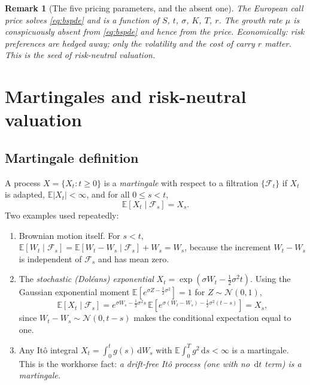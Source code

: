 \documentclass[11pt]{article}
\newcommand{\E}{\mathbb{E}}
\newcommand{\dd}{\,\mathrm{d}}
\newtheorem{remark}{Remark}
\begin{document}
\begin{remark}[The five pricing parameters, and the absent one]
The European call price solves \eqref{eq:bspde} and is a function of $S$, $t$, $\sigma$, $K$, $T$,
$r$. The growth rate $\mu$ is conspicuously \emph{absent} from \eqref{eq:bspde} and hence from the
price. Economically: risk preferences are hedged away; only the volatility and the cost of carry $r$
matter. This is the seed of risk-neutral valuation.
\end{remark}

\section{Martingales and risk-neutral valuation}

\subsection{Martingale definition}
A process $X=\{X_t : t\ge0\}$ is a \emph{martingale} with respect to a filtration $\{\mathcal F_t\}$ if
$X_t$ is adapted, $\E|X_t|<\infty$, and for all $0\le s<t$,
\begin{equation}
\E[X_t \mid \mathcal F_s] = X_s.
\end{equation}
Two examples used repeatedly:
\begin{enumerate}[label=(\alph*)]
\item Brownian motion itself. For $s<t$,
$\E[W_t\mid\mathcal F_s] = \E[W_t - W_s \mid \mathcal F_s] + W_s = W_s$,
because the increment $W_t-W_s$ is independent of $\mathcal F_s$ and has mean zero.
\item The \emph{stochastic (Dol\'eans) exponential} $X_t = \exp(\sigma W_t - \tfrac12\sigma^2 t)$.
Using the Gaussian exponential moment $\E[e^{\sigma Z - \frac12\sigma^2}]=1$ for $Z\sim\mathcal N(0,1)$,
\begin{equation}
\E[X_t\mid\mathcal F_s]
= e^{\sigma W_s - \frac12\sigma^2 s}\,
\E\!\left[e^{\sigma(W_t-W_s) - \frac12\sigma^2(t-s)}\right]
= X_s,
\end{equation}
since $W_t-W_s\sim\mathcal N(0,t-s)$ makes the conditional expectation equal to one.
\item Any It\^o integral $X_t = \int_0^t g(s)\dd W_s$ with $\E\int_0^T g^2\dd s<\infty$ is a
martingale. This is the workhorse fact: \emph{a drift-free It\^o process (one with no $\dd t$ term)
is a martingale.}
\end{enumerate}
\end{document}
